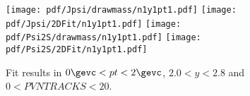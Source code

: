 \begin{figure}[H]
\begin{center}
\texttt{[image: pdf/Jpsi/drawmass/n1y1pt1.pdf]}
\texttt{[image: pdf/Jpsi/2DFit/n1y1pt1.pdf]}
\vspace*{-0.5cm}
\texttt{[image: pdf/Psi2S/drawmass/n1y1pt1.pdf]}
\texttt{[image: pdf/Psi2S/2DFit/n1y1pt1.pdf]}
\vspace*{-0.5cm}
\end{center}
\caption{Fit results in $0\gevc<pt<2\gevc$, $2.0<y<2.8$ and $0<PVNTRACKS<20$.}
\label{Fitn1y1pt1}
\end{figure}

